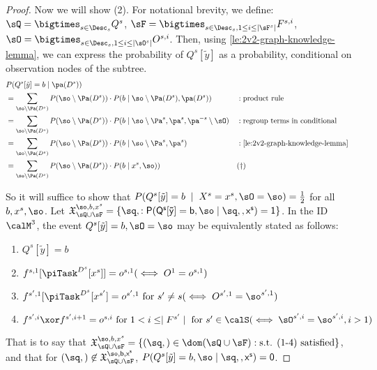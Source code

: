 \begin{proof}
Now we will show (2). 
For notational brevity, we define:
$\sQ=\bigtimes_{s \in \Desc_s} Q^s$,
$\sF=\bigtimes_{s \in \Desc_s,1\leq i\leq \mid \sF^s \mid} F^{s,i}$,
$\sO=\bigtimes_{s \in \Desc_s,1\leq i\leq \mid \sO^s \mid} O^{s,i}$.
Then, using \autoref{le:2v2-graph-knowledge-lemma}, we can express the probability of $Q^s[\tilde{y}]$ as a 
probability, conditional on observation nodes of the subtree.
\begin{align*}
&P(Q^s[\tilde{y}]=b \mid \pa(D^s)) \\
&= \sum_{\so \setminus \Pa(D^s)} P(\so \setminus \Pa(D^s)) \cdot P(b \mid \so \setminus \Pa(D^s), \pa(D^s))  && : \text{product rule} \\
&= \sum_{\so \setminus \Pa(D^s)} P(\so \setminus \Pa(D^s)) \cdot P(b \mid \so \setminus \Pa^s, \pa^s, \pa^{-s} \setminus \sO) && : \text{regroup terms in conditional} \\
&= \sum_{\so \setminus \Pa(D^s)} P(\so \setminus \Pa(D^s)) \cdot P(b \mid \so \setminus \Pa^s, \pa^s)  && :\autoref{le:2v2-graph-knowledge-lemma} \\
&= \sum_{\so \setminus \Pa(D^s)} P(\so \setminus \Pa(D^s)) \cdot P(b \mid x^s, \so))  && (\dagger)
\end{align*}



So it will suffice to show that 
$P(Q^s[\tilde y] = b \; \mid \; X^s=x^s, \sO=\so)= \frac 1 2$ for all $b, x^s, \so$.
Let $\mathfrak{X}^{\so,b,x^s}_{\sQ \cup \sF} = \{\sq,\sf : P(Q^s[\tilde{y}]=b,\so \mid \sq,\sf,x^s)=1\}$.
In the ID $\calM^3$, the event $Q^s[\tilde y] = b,\sO=\so$ may be equivalently stated as follows:

\begin{enumerate}
    \item $Q^s[\tilde{y}]=b $
    \item $f^{s,1}[\piTask^{D^s}[x^s]]=o^{s,1} (\iff O^1=o^{s,1})$
    \item $f^{s',1}[\piTask^{D^s}[x^{s'}]=o^{s',1} \text{ for } s' \neq s (\iff O^{s',1}= \so^{s',1})$
    \item $f^{s',i} \xor f^{s',i+1}=o^{s,i} \text{ for } 1 < i \leq \mid F^{s'}\mid \text{ for } s' \in \calS (\iff \sO^{s',i} = \so^{s',i},i>1)$
\end{enumerate}

That is to say that 
$\mathfrak{X}^{\so,b,x^s}_{\sQ \cup \sF}= \{(\sq,\sf) \in \dom(\sQ \cup \sF):\text{s.t. (1-4) satisfied}\}$, 
and that for $(\sq,\sf) \not \in \mathfrak{X}^{\so,b,x^s}_{\sQ \cup \sF}$, 
$P(Q^s[\tilde{y}]=b,\so \mid \sq,\sf,x^s)=0$.



\end{proof}
